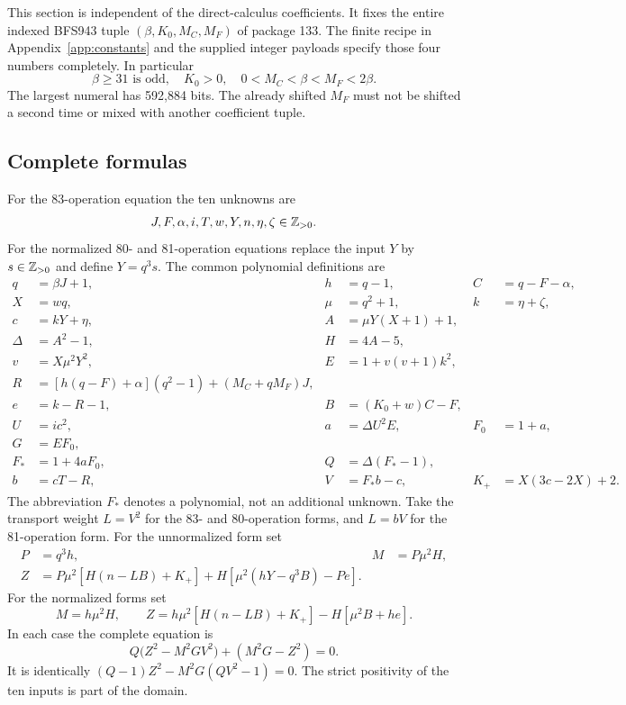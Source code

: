 This section is independent of the direct-calculus coefficients. It fixes
the entire indexed BFS943 tuple $(\beta,K_0,M_C,M_F)$ of package 133.
The finite recipe in Appendix~\ref{app:constants} and the supplied integer
payloads specify those four numbers completely. In particular
\[
 \beta\ge31\text{ is odd},\quad K_0>0,\quad
 0<M_C<\beta<M_F<2\beta.
\]
The largest numeral has 592,884 bits. The already shifted $M_F$ must not
be shifted a second time or mixed with another coefficient tuple.

\subsection{Complete formulas}

For the 83-operation equation the ten unknowns are
\[
 J,F,\alpha,i,T,w,Y,n,\eta,\zeta\in\mathbb Z_{>0}.
\]
For the normalized 80- and 81-operation equations replace the input $Y$
by $s\in\mathbb Z_{>0}$ and define $Y=q^3s$. The common polynomial definitions are
\begin{align*}
 q&=\beta J+1,& h&=q-1,& C&=q-F-\alpha,\\
 X&=wq,&\mu&=q^2+1,& k&=\eta+\zeta,\\
 c&=kY+\eta,& A&=\mu Y(X+1)+1,\\
 \Delta&=A^2-1,& H&=4A-5,\\
 v&=X\mu^2Y^2,&E&=1+v(v+1)k^2,\\
 R&=[h(q-F)+\alpha](q^2-1)+(M_C+qM_F)J,\\
 e&=k-R-1,&B&=(K_0+w)C-F,\\
 U&=ic^2,&a&=\Delta U^2E,&F_0&=1+a,\\
 G&=EF_0,\\
 F_*&=1+4aF_0,&Q&=\Delta(F_*-1),\\
 b&=cT-R,&V&=F_*b-c,&K_+&=X(3c-2X)+2.
\end{align*}
The abbreviation $F_*$ denotes a polynomial, not an additional unknown.
Take the transport weight $L=V^2$ for the 83- and 80-operation forms,
and $L=bV$ for the 81-operation form. For the unnormalized form set
\begin{align*}
 P&=q^3h,&M&=P\mu^2H,\\
 Z&=P\mu^2[H(n-LB)+K_+]
       +H[\mu^2(hY-q^3B)-Pe].
\end{align*}
For the normalized forms set
\[
 M=h\mu^2H,\qquad
 Z=h\mu^2[H(n-LB)+K_+]-H[\mu^2B+he].
\]
In each case the complete equation is
\begin{equation}\label{eq:compact}
 \boxed{Q\bigl(Z^2-M^2GV^2\bigr)+(M^2G-Z^2)=0.}
\end{equation}
It is identically $(Q-1)Z^2-M^2G(QV^2-1)=0$.
The strict positivity of the ten inputs is part of the domain.

